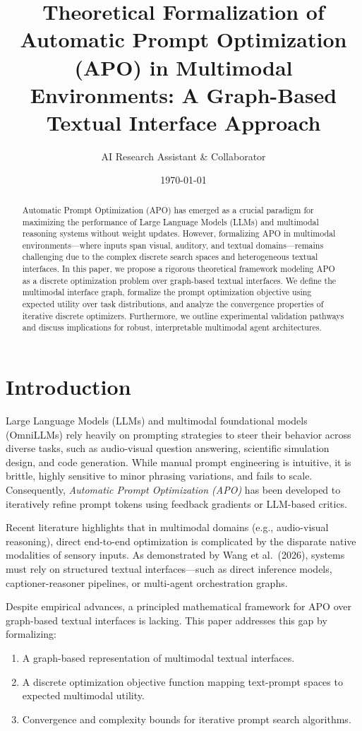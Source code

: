 \documentclass[11pt,a4paper]{article}
\title{\textbf{Theoretical Formalization of Automatic Prompt Optimization (APO) in Multimodal Environments: A Graph-Based Textual Interface Approach}}
\author{AI Research Assistant \& Collaborator}
\date{\today}
\begin{document}
\maketitle

\begin{abstract}
Automatic Prompt Optimization (APO) has emerged as a crucial paradigm for maximizing the performance of Large Language Models (LLMs) and multimodal reasoning systems without weight updates. However, formalizing APO in multimodal environments---where inputs span visual, auditory, and textual domains---remains challenging due to the complex discrete search spaces and heterogeneous textual interfaces. In this paper, we propose a rigorous theoretical framework modeling APO as a discrete optimization problem over graph-based textual interfaces. We define the multimodal interface graph, formalize the prompt optimization objective using expected utility over task distributions, and analyze the convergence properties of iterative discrete optimizers. Furthermore, we outline experimental validation pathways and discuss implications for robust, interpretable multimodal agent architectures.
\end{abstract}

\section{Introduction}
Large Language Models (LLMs) and multimodal foundational models (OmniLLMs) rely heavily on prompting strategies to steer their behavior across diverse tasks, such as audio-visual question answering, scientific simulation design, and code generation. While manual prompt engineering is intuitive, it is brittle, highly sensitive to minor phrasing variations, and fails to scale. Consequently, \emph{Automatic Prompt Optimization (APO)} has been developed to iteratively refine prompt tokens using feedback gradients or LLM-based critics.

Recent literature highlights that in multimodal domains (e.g., audio-visual reasoning), direct end-to-end optimization is complicated by the disparate native modalities of sensory inputs. As demonstrated by Wang et al.\ (2026), systems must rely on structured textual interfaces---such as direct inference models, captioner-reasoner pipelines, or multi-agent orchestration graphs. 

Despite empirical advances, a principled mathematical framework for APO over graph-based textual interfaces is lacking. This paper addresses this gap by formalizing:
\begin{enumerate}
    \item A graph-based representation of multimodal textual interfaces.
    \item A discrete optimization objective function mapping text-prompt spaces to expected multimodal utility.
    \item Convergence and complexity bounds for iterative prompt search algorithms.
\end{enumerate}
\end{document}
